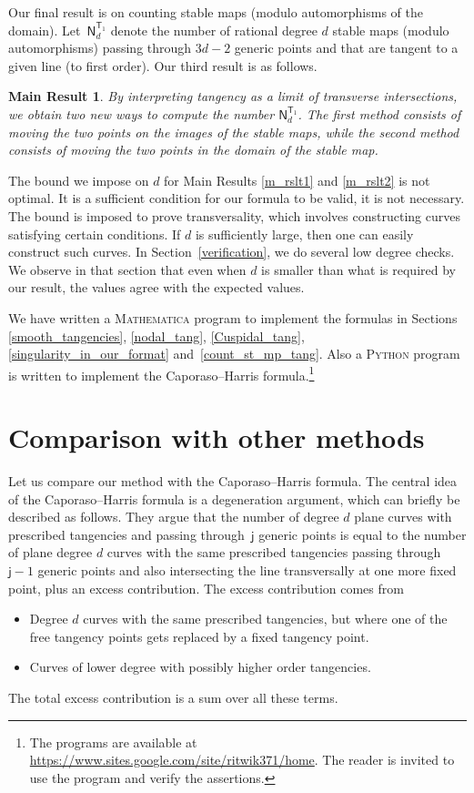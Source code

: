 \documentclass[pdftex]{sigma}
\numberwithin{equation}{section}
\newtheorem{mresult}[thm]{Main Result}
 {\theoremstyle{definition}
\newtheorem{que}[thm]{Question}
\newtheorem{conj}[thm]{Conjecture}
\newtheorem{eg}[thm]{Example}
\newtheorem{abuse_of_notation}[thm]{Abuse of Notation}
\newtheorem{claim}[thm]{Claim}
\newtheorem{verify}[thm]{Verification}
\newtheorem{result}[thm]{Result}

\newtheorem{notn}[thm]{Notation}
\newtheorem{exrc}[thm]{Exercise}

\newtheorem{rem}[thm]{Remark}
\newtheorem*{remm}{Remark}
\newtheorem{defn}[thm]{Definition} }
\begin{document}
Our final result is on counting stable maps (modulo automorphisms of the domain).
Let~$\mathsf{N}_d^{\mathsf{T}_1}$ denote the number of
rational degree $d$ stable maps (modulo automorphisms) passing through $3d-2$
generic points and
that are tangent to a given line (to first order).
Our third result is as follows.

\begin{mresult}\label{m_rslt3}
By interpreting tangency as a limit of transverse intersections, we obtain two
new ways to compute the number $\mathsf{N}_d^{\mathsf{T}_1}$. The first method
consists of
moving the two points on the images of the stable maps, while
the second method consists of moving the two points
in the domain of the stable map.
\end{mresult}

The bound we impose on $d$ for Main Results \ref{m_rslt1} and \ref{m_rslt2}
is not optimal. It is a sufficient condition for our formula
to be valid, it is not necessary. The bound is imposed to prove
transversality, which involves constructing curves satisfying certain conditions.
If $d$ is sufficiently large, then one can easily construct such curves.
In Section~\ref{verification}, we do several low degree checks.
We observe in that section that even when $d$ is smaller than what is
required by our result, the values agree with the expected values.


We have written a \textsc{Mathematica} program
to implement the formulas in Sections \ref{smooth_tangencies}, \ref{nodal_tang}, \ref{Cuspidal_tang},
\ref{singularity_in_our_format} and~\ref{count_st_mp_tang}.
Also a \textsc{Python} program is written to implement the Caporaso--Harris formula.\footnote{The programs
are available at \url{https://www.sites.google.com/site/ritwik371/home}.
The reader is invited to use the program and verify the assertions.}

\section{Comparison with other methods}

Let us compare our method with the Caporaso--Harris formula.
The central idea of the Capora\-so--Harris formula is a degeneration argument,
which can briefly be described as follows.
They argue that the
number of degree $d$ plane curves with prescribed tangencies
and passing through~$\mathsf{j}$ generic points is equal to
the number of plane degree $d$ curves with the same prescribed tangencies
passing through~$\mathsf{j}-1$ generic points and also
intersecting the line transversally at one more fixed point,
plus an excess contribution.
The excess contribution comes from
\begin{itemize}\itemsep=0pt
\item Degree $d$ curves with the same prescribed tangencies, but where one of the free tangency
points gets replaced by a fixed tangency point.
\item Curves of lower degree with possibly higher order tangencies.
\end{itemize}
The total excess contribution is a sum over all these terms.
\end{document}
